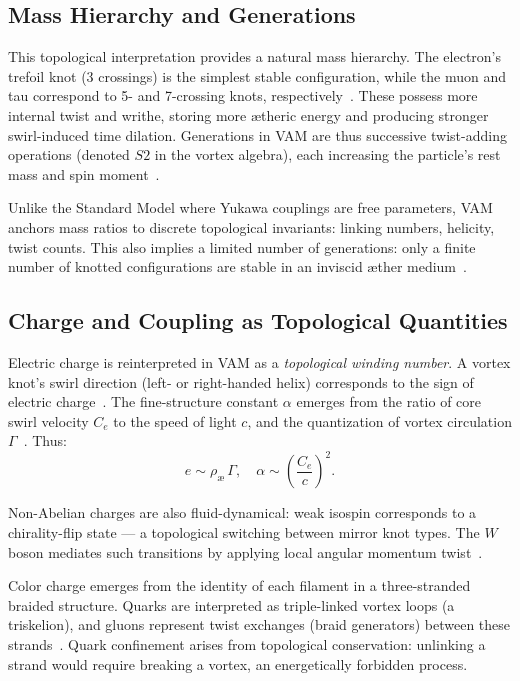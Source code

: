 \documentclass[11pt]{article}
\begin{document}
\subsection*{Mass Hierarchy and Generations}

This topological interpretation provides a natural mass hierarchy. The electron’s trefoil knot (3 crossings) is the simplest stable configuration, while the muon and tau correspond to 5- and 7-crossing knots, respectively~\cite{iskandarani2025vam5}. These possess more internal twist and writhe, storing more ætheric energy and producing stronger swirl-induced time dilation. Generations in VAM are thus successive twist-adding operations (denoted $S2$ in the vortex algebra), each increasing the particle’s rest mass and spin moment~\cite{iskandarani2025vam5}.

Unlike the Standard Model where Yukawa couplings are free parameters, VAM anchors mass ratios to discrete topological invariants: linking numbers, helicity, twist counts. This also implies a limited number of generations: only a finite number of knotted configurations are stable in an inviscid æther medium~\cite{iskandarani2025vam5}.

\subsection*{Charge and Coupling as Topological Quantities}

Electric charge is reinterpreted in VAM as a \emph{topological winding number}. A vortex knot’s swirl direction (left- or right-handed helix) corresponds to the sign of electric charge~\cite{iskandarani2025vam5}. The fine-structure constant $\alpha$ emerges from the ratio of core swirl velocity $C_e$ to the speed of light $c$, and the quantization of vortex circulation $\Gamma$~\cite{iskandarani2025vam5}. Thus:
\[
e \sim \rho_{\text{\ae}}\, \Gamma, \quad \alpha \sim \left(\frac{C_e}{c}\right)^2.
\]

Non-Abelian charges are also fluid-dynamical: weak isospin corresponds to a chirality-flip state — a topological switching between mirror knot types. The $W$ boson mediates such transitions by applying local angular momentum twist~\cite{iskandarani2025vam5}.

Color charge emerges from the identity of each filament in a three-stranded braided structure. Quarks are interpreted as triple-linked vortex loops (a triskelion), and gluons represent twist exchanges (braid generators) between these strands~\cite{iskandarani2025vam5}. Quark confinement arises from topological conservation: unlinking a strand would require breaking a vortex, an energetically forbidden process.
\end{document}
